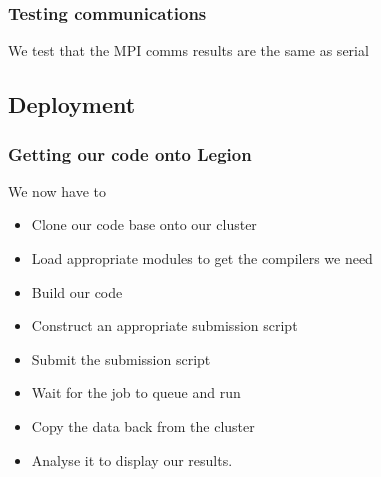 \subsubsection{Testing communications}\label{testing-communications-2}

We test that the MPI comms results are the same as serial

\begin{Shaded}
\begin{Highlighting}[]

        \NormalTok{(}  
          \NormalTok{(}  
           \NormalTok{);}
         \NormalTok{\}}
       \NormalTok{\}}
    \NormalTok{\}}
\end{Highlighting}
\end{Shaded}

\subsection{Deployment}\label{deployment}

\subsubsection{Getting our code onto
Legion}\label{getting-our-code-onto-legion}

We now have to

\begin{itemize}
\itemsep1pt\parskip0pt
\item
  Clone our code base onto our cluster
\item
  Load appropriate modules to get the compilers we need
\item
  Build our code
\item
  Construct an appropriate submission script
\item
  Submit the submission script
\item
  Wait for the job to queue and run
\item
  Copy the data back from the cluster
\item
  Analyse it to display our results.
\end{itemize}

